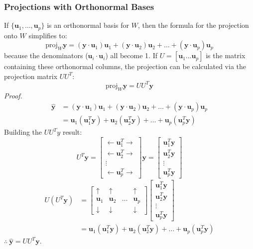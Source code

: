 \documentclass[../linear-algebra.tex]{subfiles}
\begin{document}
\subsubsection{Projections with Orthonormal Bases}
If $\{\mathbf{u}_1, \dots, \mathbf{u}_p\}$ is an orthonormal basis for $W$, then the formula for the projection onto $W$ simplifies to:
$$\text{proj}_W \mathbf{y} = (\mathbf{y} \cdot \mathbf{u}_1)\mathbf{u}_1 + (\mathbf{y} \cdot \mathbf{u}_2)\mathbf{u}_2 + \dots + (\mathbf{y} \cdot \mathbf{u}_p)\mathbf{u}_p$$
because the denominators ($\mathbf{u}_i \cdot \mathbf{u}_i$) all become 1.\newline
If $U = [\mathbf{u}_1 \dots \mathbf{u}_p]$ is the matrix containing these orthonormal columns, the projection can be calculated via the projection matrix $UU^T$:
$$\text{proj}_W \mathbf{y} = U U^T \mathbf{y}$$
\textit{Proof.}
\begin{align*}
    \hat{\mathbf{y}} &= (\mathbf{y} \cdot \mathbf{u}_1)\mathbf{u}_1 + (\mathbf{y} \cdot \mathbf{u}_2)\mathbf{u}_2 + \dots + (\mathbf{y} \cdot \mathbf{u}_p)\mathbf{u}_p\\
    &= \mathbf{u}_1(\mathbf{u}_1^T \mathbf{y}) + \mathbf{u}_2(\mathbf{u}_2^T \mathbf{y}) + \dots + \mathbf{u}_p(\mathbf{u}_p^T \mathbf{y})
\end{align*}
Building the $UU^Ty$ result:
$$U^T \mathbf{y} = \begin{bmatrix} \leftarrow \mathbf{u}_1^T \rightarrow \\ \leftarrow \mathbf{u}_2^T \rightarrow \\ \vdots \\ \leftarrow \mathbf{u}_p^T \rightarrow \end{bmatrix} \mathbf{y} = \begin{bmatrix} \mathbf{u}_1^T \mathbf{y} \\ \mathbf{u}_2^T \mathbf{y} \\ \vdots \\ \mathbf{u}_p^T \mathbf{y} \end{bmatrix}$$
\begin{align*}
    U (U^T \mathbf{y}) &= \begin{bmatrix} \uparrow & \uparrow & & \uparrow \\ \mathbf{u}_1 & \mathbf{u}_2 & \dots & \mathbf{u}_p \\ \downarrow & \downarrow & & \downarrow \end{bmatrix} \begin{bmatrix} \mathbf{u}_1^T \mathbf{y} \\ \mathbf{u}_2^T \mathbf{y} \\ \vdots \\ \mathbf{u}_p^T \mathbf{y} \end{bmatrix}\\
    &= \mathbf{u}_1(\mathbf{u}_1^T \mathbf{y}) + \mathbf{u}_2(\mathbf{u}_2^T \mathbf{y}) + \dots + \mathbf{u}_p(\mathbf{u}_p^T \mathbf{y})
\end{align*}
$\therefore\:\hat{\mathbf{y}} = UU^T\mathbf{y}$.
\end{document}
